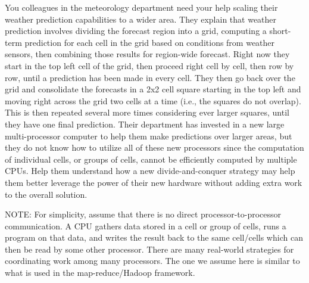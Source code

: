 \documentclass[12pt]{article}
\begin{document}
\renewcommand{\headrulewidth}{0.5pt}

\phantom{Test}

You colleagues in the meteorology department need your help scaling their weather prediction capabilities to a wider area. They explain that weather prediction involves dividing the forecast region into a grid, computing a short-term prediction for each cell in the grid based on conditions from weather sensors, then combining those results for region-wide forecast. Right now they start in the top left cell of the grid, then proceed right cell by cell, then row by row, until a prediction has been made in every cell. They then go back over the grid and consolidate the forecasts in a 2x2 cell square starting in the top left and moving right across the grid two cells at a time (i.e., the squares do not overlap). This is then repeated several more times considering ever larger squares, until they have one final prediction. Their department has invested in a new large multi-processor computer to help them make predictions over larger areas, but they do not know how to utilize all of these new processors since the computation of individual cells, or groups of cells, cannot be efficiently computed by multiple CPUs. Help them understand how a new divide-and-conquer strategy may help them better leverage the power of their new hardware without adding extra work to the overall solution.

NOTE: For simplicity, assume that there is no direct processor-to-processor communication. A CPU gathers data stored in a cell or group of cells, runs a program on that data, and writes the result back to the same cell/cells which can then be read by some other processor. There are many real-world strategies for coordinating work among many processors. The one we assume here is similar to what is used in the map-reduce/Hadoop framework.



\pagebreak

\newpage
\mbox{}
\newpage
\pagebreak
\end{document}
